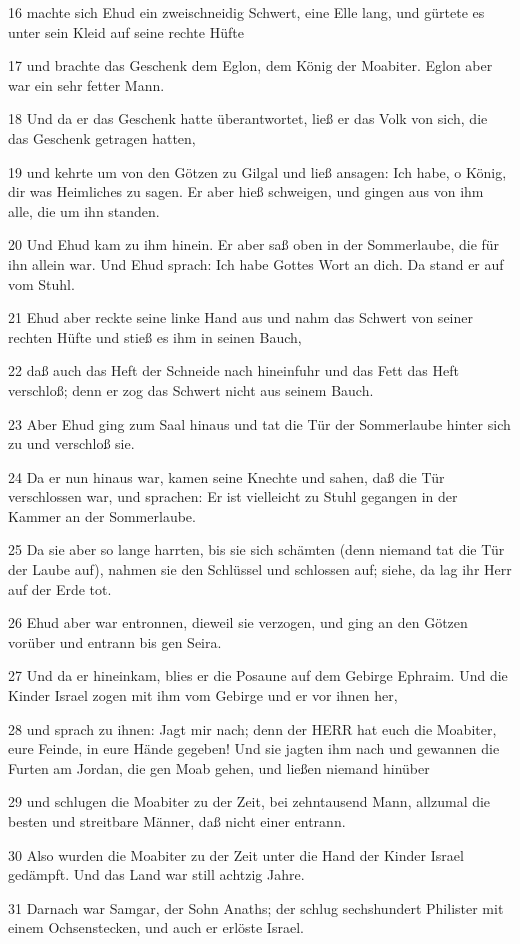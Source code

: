 \par 16 machte sich Ehud ein zweischneidig Schwert, eine Elle lang, und gürtete es unter sein Kleid auf seine rechte Hüfte
\par 17 und brachte das Geschenk dem Eglon, dem König der Moabiter. Eglon aber war ein sehr fetter Mann.
\par 18 Und da er das Geschenk hatte überantwortet, ließ er das Volk von sich, die das Geschenk getragen hatten,
\par 19 und kehrte um von den Götzen zu Gilgal und ließ ansagen: Ich habe, o König, dir was Heimliches zu sagen. Er aber hieß schweigen, und gingen aus von ihm alle, die um ihn standen.
\par 20 Und Ehud kam zu ihm hinein. Er aber saß oben in der Sommerlaube, die für ihn allein war. Und Ehud sprach: Ich habe Gottes Wort an dich. Da stand er auf vom Stuhl.
\par 21 Ehud aber reckte seine linke Hand aus und nahm das Schwert von seiner rechten Hüfte und stieß es ihm in seinen Bauch,
\par 22 daß auch das Heft der Schneide nach hineinfuhr und das Fett das Heft verschloß; denn er zog das Schwert nicht aus seinem Bauch.
\par 23 Aber Ehud ging zum Saal hinaus und tat die Tür der Sommerlaube hinter sich zu und verschloß sie.
\par 24 Da er nun hinaus war, kamen seine Knechte und sahen, daß die Tür verschlossen war, und sprachen: Er ist vielleicht zu Stuhl gegangen in der Kammer an der Sommerlaube.
\par 25 Da sie aber so lange harrten, bis sie sich schämten (denn niemand tat die Tür der Laube auf), nahmen sie den Schlüssel und schlossen auf; siehe, da lag ihr Herr auf der Erde tot.
\par 26 Ehud aber war entronnen, dieweil sie verzogen, und ging an den Götzen vorüber und entrann bis gen Seira.
\par 27 Und da er hineinkam, blies er die Posaune auf dem Gebirge Ephraim. Und die Kinder Israel zogen mit ihm vom Gebirge und er vor ihnen her,
\par 28 und sprach zu ihnen: Jagt mir nach; denn der HERR hat euch die Moabiter, eure Feinde, in eure Hände gegeben! Und sie jagten ihm nach und gewannen die Furten am Jordan, die gen Moab gehen, und ließen niemand hinüber
\par 29 und schlugen die Moabiter zu der Zeit, bei zehntausend Mann, allzumal die besten und streitbare Männer, daß nicht einer entrann.
\par 30 Also wurden die Moabiter zu der Zeit unter die Hand der Kinder Israel gedämpft. Und das Land war still achtzig Jahre.
\par 31 Darnach war Samgar, der Sohn Anaths; der schlug sechshundert Philister mit einem Ochsenstecken, und auch er erlöste Israel.

